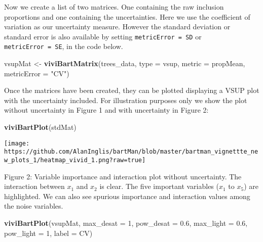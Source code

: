 \documentclass[
]{article}
\newenvironment{Shaded}{\begin{snugshade}}{\end{snugshade}}
\newcommand{\AttributeTok}[1]{\textcolor[rgb]{0.13,0.29,0.53}{#1}}
\newcommand{\DecValTok}[1]{\textcolor[rgb]{0.00,0.00,0.81}{#1}}
\newcommand{\FloatTok}[1]{\textcolor[rgb]{0.00,0.00,0.81}{#1}}
\newcommand{\FunctionTok}[1]{\textcolor[rgb]{0.13,0.29,0.53}{\textbf{#1}}}
\newcommand{\NormalTok}[1]{#1}
\newcommand{\OtherTok}[1]{\textcolor[rgb]{0.56,0.35,0.01}{#1}}
\newcommand{\StringTok}[1]{\textcolor[rgb]{0.31,0.60,0.02}{#1}}
\begin{document}
Now we create a list of two matrices. One containing the raw inclusion
proportions and one containing the uncertainties. Here we use the
coefficient of variation as our uncertainty measure. However the
standard deviation or standard error is also available by setting
\texttt{metricError\ =\ \textquotesingle{}SD\textquotesingle{}} or
\texttt{metricError\ =\ \textquotesingle{}SE\textquotesingle{}}, in the
code below.

\begin{Shaded}
\begin{Highlighting}[]
\NormalTok{vsupMat }\OtherTok{\textless{}{-}} \FunctionTok{viviBartMatrix}\NormalTok{(trees\_data,}
                          \AttributeTok{type =} \StringTok{\textquotesingle{}vsup\textquotesingle{}}\NormalTok{,}
                          \AttributeTok{metric =} \StringTok{\textquotesingle{}propMean\textquotesingle{}}\NormalTok{,}
                          \AttributeTok{metricError =} \StringTok{"CV"}\NormalTok{)}
\end{Highlighting}
\end{Shaded}

Once the matrices have been created, they can be plotted displaying a
VSUP plot with the uncertainty included. For illustration purposes only
we show the plot without uncertainty in Figure 1 and with uncertainty in
Figure 2:

\begin{Shaded}
\begin{Highlighting}[]
\FunctionTok{viviBartPlot}\NormalTok{(stdMat)}
\end{Highlighting}
\end{Shaded}

\begin{center}\texttt{[image: https://github.com/AlanInglis/bartMan/blob/master/bartman\_vignettte\_new\_plots\_1/heatmap\_vivid\_1.png?raw=true]} \end{center}

\protect\hypertarget{fig2:fig2}{}{Figure 2: } Variable importance and
interaction plot without uncertainty. The interaction between \(x_1\)
and \(x_2\) is clear. The five important variables (\(x_1\) to \(x_5\))
are highlighted. We can also see spurious importance and interaction
values among the noise variables.

\begin{Shaded}
\begin{Highlighting}[]
\FunctionTok{viviBartPlot}\NormalTok{(vsupMat,}
             \AttributeTok{max\_desat =} \DecValTok{1}\NormalTok{,}
             \AttributeTok{pow\_desat =} \FloatTok{0.6}\NormalTok{,}
             \AttributeTok{max\_light =} \FloatTok{0.6}\NormalTok{,}
             \AttributeTok{pow\_light =} \DecValTok{1}\NormalTok{,}
             \AttributeTok{label =} \StringTok{\textquotesingle{}CV\textquotesingle{}}\NormalTok{)}
\end{Highlighting}
\end{Shaded}
\end{document}
